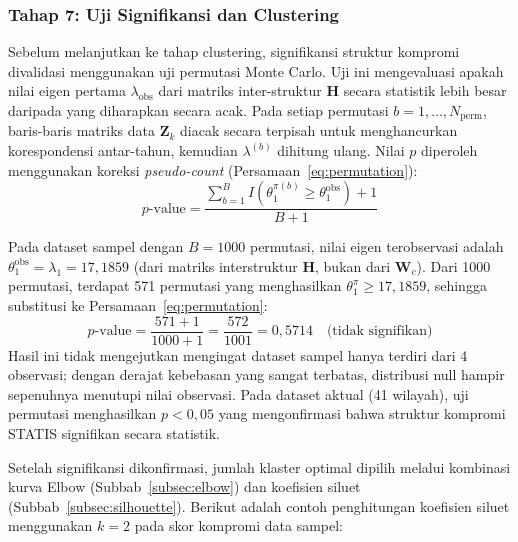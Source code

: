 \subsubsection{Tahap 7: Uji Signifikansi dan Clustering}
Sebelum melanjutkan ke tahap clustering, signifikansi struktur kompromi divalidasi menggunakan uji permutasi Monte Carlo. Uji ini mengevaluasi apakah nilai eigen pertama $\lambda_{\text{obs}}$ dari matriks inter-struktur $\mathbf{H}$ secara statistik lebih besar daripada yang diharapkan secara acak. Pada setiap permutasi $b = 1, \ldots, N_{\text{perm}}$, baris-baris matriks data $\mathbf{Z}_k$ diacak secara terpisah untuk menghancurkan korespondensi antar-tahun, kemudian $\lambda^{(b)}$ dihitung ulang. Nilai $p$ diperoleh menggunakan koreksi \textit{pseudo-count} (Persamaan~\ref{eq:permutation}):
\[
  p\text{-value} = \frac{\displaystyle\sum_{b=1}^{B} I\!\left(\theta_1^{\pi(b)} \ge \theta_1^{\text{obs}}\right) + 1}{B + 1}
\]

Pada dataset sampel dengan $B = 1000$ permutasi, nilai eigen terobservasi adalah $\theta_1^{\text{obs}} = \lambda_1 = 17{,}1859$ (dari matriks interstruktur $\mathbf{H}$, bukan dari $\mathbf{W}_c$). Dari 1000 permutasi, terdapat 571 permutasi yang menghasilkan $\theta_1^{\pi} \ge 17{,}1859$, sehingga substitusi ke Persamaan~\ref{eq:permutation}:
\[
  p\text{-value} = \frac{571+1}{1000+1} = \frac{572}{1001} = 0{,}5714 \quad \text{(tidak signifikan)}
\]
Hasil ini tidak mengejutkan mengingat dataset sampel hanya terdiri dari 4 observasi; dengan derajat kebebasan yang sangat terbatas, distribusi null hampir sepenuhnya menutupi nilai observasi. Pada dataset aktual (41 wilayah), uji permutasi menghasilkan $p < 0{,}05$ yang mengonfirmasi bahwa struktur kompromi STATIS signifikan secara statistik.

Setelah signifikansi dikonfirmasi, jumlah klaster optimal dipilih melalui kombinasi kurva Elbow (Subbab~\ref{subsec:elbow}) dan koefisien siluet (Subbab~\ref{subsec:silhouette}). Berikut adalah contoh penghitungan koefisien siluet menggunakan $k=2$ pada skor kompromi data sampel:

